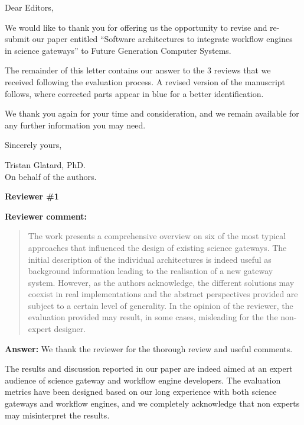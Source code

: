 \documentclass[a4]{letter}
\date{October 16th, 2016}
\newenvironment{review}%
{\textbf{Reviewer comment:}\begin{quote}}%
{\end{quote}}%
\newcommand{\answer}[1]{\textbf{Answer:} #1}
\begin{document}
\begin{letter}{}

\opening{Dear Editors,}

We would like to thank you for offering us the opportunity to revise
and re-submit our paper entitled ``Software architectures to integrate
workflow engines in science gateways'' to Future Generation Computer
Systems.

The remainder of this letter contains our answer to the 3 reviews that
we received following the evaluation process. A revised version of the
manuscript follows, where corrected parts appear in blue for a better
identification. 

We thank you again for your time and consideration, and we remain available for any further information you may need.

\vspace{0.5cm}

Sincerely yours,

\vspace{1cm}

\closing{Tristan Glatard, PhD.\\On behalf of the authors.}

\newpage

\textbf{Reviewer \#1}

\begin{review}
  The work presents a comprehensive overview on six of the most
  typical approaches that influenced the design of existing science
  gateways. The initial description of the individual architectures is
  indeed useful as background information leading to the realisation
  of a new gateway system. However, as the authors acknowledge, the
  different solutions may coexist in real implementations and the
  abstract perspectives provided are subject to a certain level of
  generality. In the opinion of the reviewer, the evaluation provided
  may result, in some cases, misleading for the the non-expert
  designer.
\end{review}

\answer{We thank the reviewer for the thorough review and useful comments.

  The results and discussion reported in our paper are indeed aimed at
  an expert audience of science gateway and workflow engine
  developers. The evaluation metrics have been designed based on our
  long experience with both science gateways and workflow engines, and
  we completely acknowledge that non experts may misinterpret the
  results.

}
\end{letter}
\end{document}
